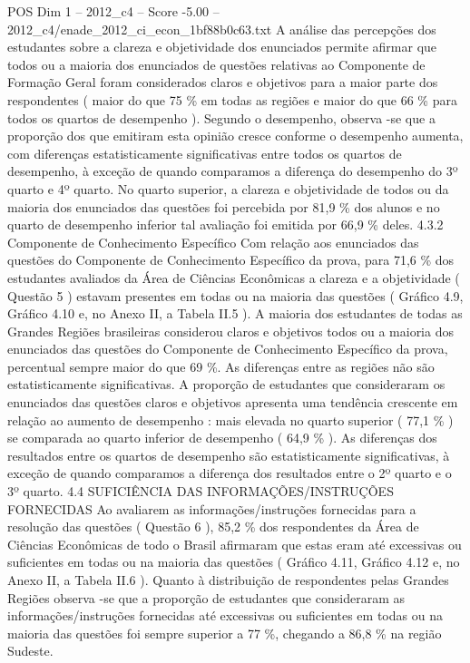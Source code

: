 \begin{textsample}{POS Dim 1 – 2012\_c4 – Score -5.00 – 2012\_c4/enade\_2012\_ci\_econ\_1bf88b0c63.txt}
A análise das percepções dos estudantes sobre a clareza e objetividade dos enunciados permite afirmar que todos ou a maioria dos enunciados de questões relativas ao Componente de Formação Geral foram considerados claros e objetivos para a maior parte dos respondentes ( maior do que 75 \% em todas as regiões e maior do que 66 \% para todos os quartos de desempenho ).
Segundo o desempenho, observa -se que a proporção dos que emitiram esta opinião cresce conforme o desempenho aumenta, com diferenças estatisticamente significativas entre todos os quartos de desempenho, à exceção de quando comparamos a diferença do desempenho do 3º quarto e 4º quarto.
No quarto superior, a clareza e objetividade de todos ou da maioria dos enunciados das questões foi percebida por 81,9 \% dos alunos e no quarto de desempenho inferior tal avaliação foi emitida por 66,9 \% deles. 4.3.2 Componente de Conhecimento Específico Com relação aos enunciados das questões do Componente de Conhecimento Específico da prova, para 71,6 \% dos estudantes avaliados da Área de Ciências Econômicas a clareza e a objetividade ( Questão 5 ) estavam presentes em todas ou na maioria das questões ( Gráfico 4.9, Gráfico 4.10 e, no Anexo II, a Tabela II.5 ).
A maioria dos estudantes de todas as Grandes Regiões brasileiras considerou claros e objetivos todos ou a maioria dos enunciados das questões do Componente de Conhecimento Específico da prova, percentual sempre maior do que 69 \%.
As diferenças entre as regiões não são estatisticamente significativas.
A proporção de estudantes que consideraram os enunciados das questões claros e objetivos apresenta uma tendência crescente em relação ao aumento de desempenho : mais elevada no quarto superior ( 77,1 \% ) se comparada ao quarto inferior de desempenho ( 64,9 \% ).
As diferenças dos resultados entre os quartos de desempenho são estatisticamente significativas, à exceção de quando comparamos a diferença dos resultados entre o 2º quarto e o 3º quarto. 4.4 SUFICIÊNCIA DAS INFORMAÇÕES/INSTRUÇÕES FORNECIDAS Ao avaliarem as informações/instruções fornecidas para a resolução das questões ( Questão 6 ), 85,2 \% dos respondentes da Área de Ciências Econômicas de todo o Brasil afirmaram que estas eram até excessivas ou suficientes em todas ou na maioria das questões ( Gráfico 4.11, Gráfico 4.12 e, no Anexo II, a Tabela II.6 ).
Quanto à distribuição de respondentes pelas Grandes Regiões observa -se que a proporção de estudantes que consideraram as informações/instruções fornecidas até excessivas ou suficientes em todas ou na maioria das questões foi sempre superior a 77 \%, chegando a 86,8 \% na região Sudeste.

\end{textsample}
